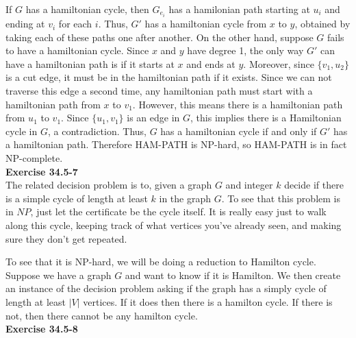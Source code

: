 \documentclass{article}
\begin{document}
If $G$ has a hamiltonian cycle, then $G_{e_i}$ has a hamilonian path starting at $u_i$ and ending at $v_i$ for each $i$.  Thus, $G'$ has a hamiltonian cycle from $x$ to $y$, obtained by taking each of these paths one after another.  On the other hand, suppose $G$ fails to have a hamiltonian cycle.  Since $x$ and $y$ have degree 1, the only way $G'$ can have a hamiltonian path is if it starts at $x$ and ends at $y$.  Moreover, since $\{v_1, u_2\}$ is a cut edge, it must be in the hamiltonian path if it exists.  Since we can not traverse this edge a second time, any hamiltonian path must start with a hamiltonian path from $x$ to $v_1$.  However, this means there is a hamiltonian path from $u_1$ to $v_1$.  Since $\{u_1,v_1\}$ is an edge in $G$, this implies there is a Hamiltonian cycle in $G$, a contradiction.  Thus, $G$ has a hamiltonian cycle if and only if $G'$ has a hamiltonian path.  Therefore HAM-PATH is NP-hard, so HAM-PATH is in fact NP-complete. \\

\noindent\textbf{Exercise 34.5-7}\\

The related decision problem is to, given a graph $G$ and integer $k$ decide if there is a simple cycle of length at least $k$ in the graph $G$. To see that this problem is in $NP$, just let the certificate be the cycle itself. It is really easy just to walk along this cycle, keeping track of what vertices you've already seen, and making sure they don't get repeated.

To see that it is NP-hard, we will be doing a reduction to Hamilton cycle. Suppose we have a graph $G$ and want to know if it is Hamilton. We then create an instance of the decision problem asking if the graph has a simply cycle of length at least $|V|$ vertices. If it does then there is a hamilton cycle. If there is not, then there cannot be any hamilton cycle.\\

\noindent\textbf{Exercise 34.5-8}\\
\end{document}
